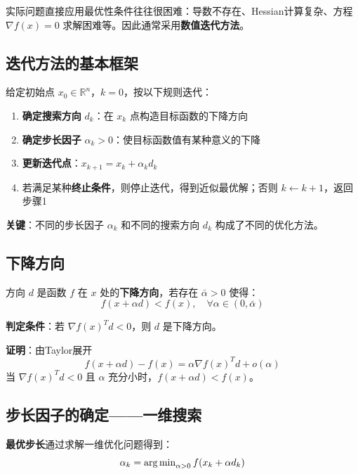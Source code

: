 实际问题直接应用最优性条件往往很困难：导数不存在、Hessian计算复杂、方程 $\nabla f(x) = 0$ 求解困难等。因此通常采用\textbf{数值迭代方法}。

\subsection{迭代方法的基本框架}

\begin{algobox}[最优化方法的基本结构]
给定初始点 $x_0 \in \mathbb{R}^n$，$k = 0$，按以下规则迭代：
\begin{enumerate}[label=\arabic*., leftmargin=2em]
    \item \textbf{确定搜索方向} $d_k$：在 $x_k$ 点构造目标函数的下降方向
    \item \textbf{确定步长因子} $\alpha_k > 0$：使目标函数值有某种意义的下降
    \item \textbf{更新迭代点}：$x_{k+1} = x_k + \alpha_k d_k$
    \item 若满足某种\textbf{终止条件}，则停止迭代，得到近似最优解；否则 $k \leftarrow k+1$，返回步骤1
\end{enumerate}
\end{algobox}

\textbf{关键}：不同的步长因子 $\alpha_k$ 和不同的搜索方向 $d_k$ 构成了不同的优化方法。

\subsection{下降方向}

\begin{definition}[下降方向]
方向 $d$ 是函数 $f$ 在 $x$ 处的\textbf{下降方向}，若存在 $\bar{\alpha} > 0$ 使得：
\[
f(x + \alpha d) < f(x),\quad \forall \alpha \in (0, \bar{\alpha})
\]
\end{definition}

\textbf{判定条件}：若 $\nabla f(x)^T d < 0$，则 $d$ 是下降方向。

\textbf{证明}：由Taylor展开
\[
f(x + \alpha d) - f(x) = \alpha \nabla f(x)^T d + o(\alpha)
\]
当 $\nabla f(x)^T d < 0$ 且 $\alpha$ 充分小时，$f(x + \alpha d) < f(x)$。

\subsection{步长因子的确定——一维搜索}

\textbf{最优步长}通过求解一维优化问题得到：
\[
\alpha_k = \operatorname{arg\,min}_{\alpha > 0} f(x_k + \alpha d_k)
\]

